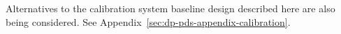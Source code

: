 Alternatives to the calibration system baseline design described here are also being considered. See Appendix~\ref{sec:dp-pds-appendix-calibration}. 





